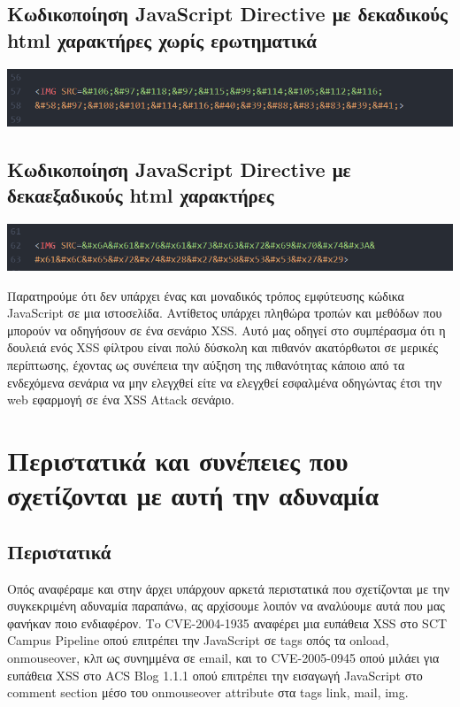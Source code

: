 \subsection{Κωδικοποίηση JavaScript Directive με δεκαδικούς html χαρακτήρες χωρίς ερωτηματικά }
\begin{center}
			\includegraphics[width=1\textwidth]{image/21.PNG}		
\end{center}
\subsection{Κωδικοποίηση JavaScript Directive με δεκαεξαδικούς html χαρακτήρες}
\begin{center}
			\includegraphics[width=1\textwidth]{image/22.PNG}		
\end{center}
\noindent
Παρατηρούμε ότι δεν υπάρχει ένας και μοναδικός τρόπος εμφύτευσης κώδικα JavaScript  σε μια ιστοσελίδα. Αντίθετος υπάρχει πληθώρα τροπών και μεθόδων που μπορούν να οδηγήσουν σε ένα σενάριο XSS. Αυτό μας οδηγεί στο συμπέρασμα ότι η δουλειά ενός XSS φίλτρου είναι πολύ δύσκολη και πιθανόν ακατόρθωτοι σε μερικές περίπτωσης, έχοντας ως συνέπεια την αύξηση της πιθανότητας κάποιο από τα ενδεχόμενα σενάρια να μην ελεγχθεί είτε να ελεγχθεί εσφαλμένα οδηγώντας έτσι την web εφαρμογή σε ένα XSS Attack σενάριο.

\section{Περιστατικά και συνέπειες που σχετίζονται με αυτή την αδυναμία}


\subsection{Περιστατικά}
\noindent
Οπός αναφέραμε και στην άρχει υπάρχουν αρκετά περιστατικά που σχετίζονται με την συγκεκριμένη αδυναμία παραπάνω, ας αρχίσουμε λοιπόν να αναλύουμε αυτά που μας φανήκαν ποιο ενδιαφέρον. Τo CVE-2004-1935 αναφέρει μια ευπάθεια XSS στο SCT Campus Pipeline οπού επιτρέπει την JavaScript  σε tags οπός τα onload, onmouseover, κλπ ως συνημμένα σε email, και το CVE-2005-0945 οπού μιλάει για ευπάθεια XSS στο ACS Blog 1.1.1 οπού επιτρέπει την εισαγωγή JavaScript στο comment section μέσο του onmouseover attribute στα tags link, mail, img.  

